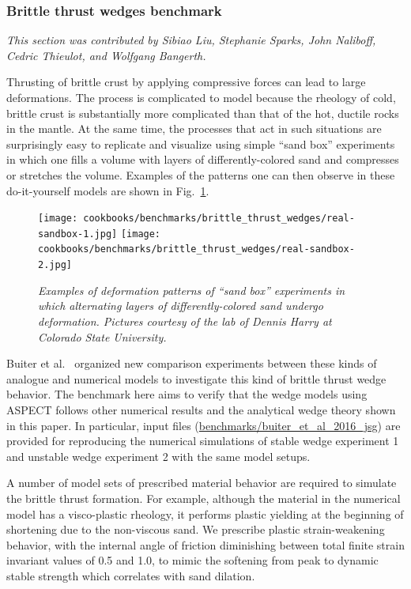\documentclass{article}
\newcommand{\aspect}{\textsc{ASPECT}}
\begin{document}
\subsubsection{Brittle thrust wedges benchmark}
\label{sec:benchmark-brittle-thrust-wedge}

\textit{This section was contributed by Sibiao Liu, Stephanie Sparks, John 
Naliboff, Cedric Thieulot, and Wolfgang Bangerth.}

Thrusting of brittle crust by applying compressive forces can lead to
large deformations. The process is complicated to model because the
rheology of cold, brittle crust is substantially more complicated than
that of the hot, ductile rocks in the mantle. At the same time, the
processes that act in such situations are surprisingly easy to
replicate and visualize using simple ``sand box'' experiments in which
one fills a volume with layers of differently-colored sand and compresses
or stretches the volume. Examples of the patterns one can then observe
in these do-it-yourself models are shown in
Fig.~\ref{fig:sandbox-images}.

\begin{figure}
  \centering
  \texttt{[image: cookbooks/benchmarks/brittle\_thrust\_wedges/real-sandbox-1.jpg]}
  \hfill
  \texttt{[image: cookbooks/benchmarks/brittle\_thrust\_wedges/real-sandbox-2.jpg]}
  \caption{\it Examples of deformation patterns of ``sand box'' experiments in
    which alternating layers of differently-colored sand undergo deformation.
    Pictures courtesy of the lab of Dennis Harry at Colorado State University.}
  \label{fig:sandbox-images}
\end{figure}

Buiter et al.~\cite{buiter16} organized new comparison experiments between these kinds of 
analogue and numerical models to investigate this kind of brittle thrust wedge behavior. The 
benchmark here aims to verify that the wedge models using \aspect{} follows other 
numerical results and the analytical wedge theory shown in this paper. In particular, 
input files (\url{benchmarks/buiter_et_al_2016_jsg}) are provided for reproducing 
the numerical simulations of stable wedge experiment 1 and unstable wedge experiment 
2 with the same model setups.

A number of model sets of prescribed material behavior are required to simulate 
the brittle thrust formation. For example, although the material in the numerical 
model has a visco-plastic rheology, it performs plastic yielding at the beginning 
of shortening due to the non-viscous sand. We prescribe plastic strain-weakening 
behavior, with the internal angle of friction diminishing between total finite 
strain invariant values of 0.5 and 1.0, to mimic the softening from peak to 
dynamic stable strength which correlates with sand dilation. 
\end{document}
